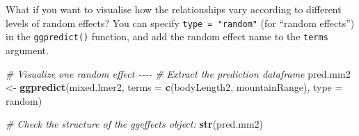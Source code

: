 \documentclass[
]{article}
\newenvironment{Shaded}{\begin{snugshade}}{\end{snugshade}}
\newcommand{\AttributeTok}[1]{\textcolor[rgb]{0.13,0.29,0.53}{#1}}
\newcommand{\CommentTok}[1]{\textcolor[rgb]{0.56,0.35,0.01}{\textit{#1}}}
\newcommand{\FunctionTok}[1]{\textcolor[rgb]{0.13,0.29,0.53}{\textbf{#1}}}
\newcommand{\NormalTok}[1]{#1}
\newcommand{\OtherTok}[1]{\textcolor[rgb]{0.56,0.35,0.01}{#1}}
\newcommand{\StringTok}[1]{\textcolor[rgb]{0.31,0.60,0.02}{#1}}
\begin{document}
What if you want to visualise how the relationships vary according to
different levels of random effects? You can specify
\texttt{type\ =\ "random"} (for ``random effects'') in the
\texttt{ggpredict()} function, and add the random effect name to the
\texttt{terms} argument.

\begin{Shaded}
\begin{Highlighting}[]
\CommentTok{\# Visualize one random effect {-}{-}{-}{-}}
\CommentTok{\# Extract the prediction dataframe}
\NormalTok{pred.mm2 }\OtherTok{\textless{}{-}} \FunctionTok{ggpredict}\NormalTok{(mixed.lmer2, }\AttributeTok{terms =} \FunctionTok{c}\NormalTok{(}\StringTok{\textquotesingle{}bodyLength2\textquotesingle{}}\NormalTok{, }\StringTok{\textquotesingle{}mountainRange\textquotesingle{}}\NormalTok{), }\AttributeTok{type =} \StringTok{\textquotesingle{}random\textquotesingle{}}\NormalTok{)}

\CommentTok{\# Check the structure of the ggeffects object:}
\FunctionTok{str}\NormalTok{(pred.mm2)}
\end{Highlighting}
\end{Shaded}
\end{document}
